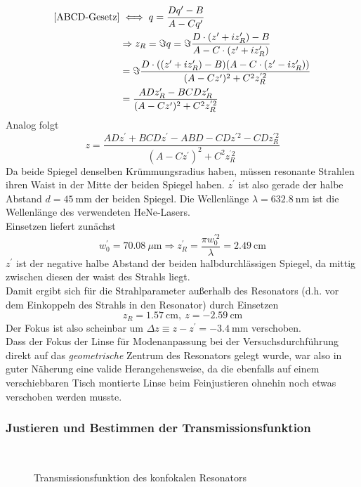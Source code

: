 \documentclass[11pt,a4paper,oneside]{scrartcl}
\begin{document}
\begin{align}
\ref{ABCD-Gesetz}& \iff q = \frac{Dq^\prime-B}{A-Cq^\prime}\\ & \Rightarrow z_R=\Im{q}=\Im{\frac{D\cdot (z^\prime+iz_R^\prime)-B}{A-C\cdot(z^\prime+iz_R^\prime)}}\\ \quad&=\Im{\frac{D\cdot ((z^\prime+iz_R^\prime)-B)(A-C\cdot(z^\prime-iz_R^\prime))}{(A-Cz^\prime)^2+C^2z_R^{^\prime 2}}}\\ \quad&
=\frac{ADz_R^\prime-BCDz_R^\prime}{(A-Cz^\prime)^2+C^2z_R^{^\prime 2}}
\end{align}
Analog folgt 
\begin{equation}
z=\frac{ADz^\prime+BCDz^\prime-ABD-CDz^{\prime 2}-CDz_R^{\prime 2}}{(A-Cz^\prime)^2+C^2z_R^{^\prime 2}}
\end{equation}
Da beide Spiegel denselben Krümmungsradius haben, müssen resonante Strahlen ihren Waist in der Mitte der beiden Spiegel haben. $z^\prime$ ist also gerade der halbe Abstand $d=45\ \mathrm{mm}$ der beiden Spiegel. Die Wellenlänge $\lambda=632.8\ \mathrm{nm}$ ist die Wellenlänge des verwendeten HeNe-Lasers. \\
Einsetzen liefert zunächst
\begin{equation}
w_0^\prime = 70.08\ \mu\mathrm m\Rightarrow z_R^\prime = \frac{\pi w_0^{\prime 2}}{\lambda} = 2.49\ \mathrm{cm}
\end{equation}
 $z^\prime$ ist der negative halbe Abstand der beiden halbdurchlässigen Spiegel, da mittig zwischen diesen der waist des Strahls liegt. \\
Damit ergibt sich für die Strahlparameter außerhalb des Resonators (d.h. vor dem Einkoppeln des Strahls in den Resonator) durch Einsetzen
\begin{equation}
z_R = 1.57\ \mathrm{cm},\ z = -2.59\ \mathrm{cm}
\end{equation}
Der Fokus ist also scheinbar um $\Delta z\equiv z-z^\prime = -3.4\ \mathrm{mm}$ verschoben. \\
Dass der Fokus der Linse für Modenanpassung bei der Versuchsdurchführung direkt auf das \emph{geometrische} Zentrum des Resonators gelegt wurde, war also in guter Näherung eine valide Herangehensweise, da die ebenfalls auf einem verschiebbaren Tisch montierte Linse beim Feinjustieren ohnehin noch etwas verschoben werden musste.
\subsubsection{Justieren und Bestimmen der Transmissionsfunktion}
\begin{figure}[H]

    \centering
  \\
   \caption{Transmissionsfunktion des konfokalen Resonators}
    \label{FotostreckeTransmissionsfunktion}
\end{figure}
\end{document}
